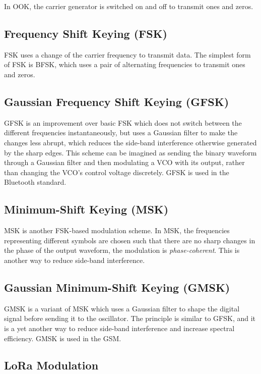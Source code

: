 In \gls{OOK}, the carrier generator is switched on and off to transmit ones and zeros. 

\subsection{Frequency Shift Keying (FSK)}

\Gls{FSK} uses a change of the carrier frequency to transmit data. The simplest form of \gls{FSK} is \gls{BFSK}, which uses a pair of alternating frequencies to transmit ones and zeros.

\subsection{Gaussian Frequency Shift Keying (GFSK)}

\Gls{GFSK} is an improvement over basic \gls{FSK} which does not switch between the different frequencies instantaneously, but uses a Gaussian filter to make the changes less abrupt, which reduces the side-band interference otherwise generated by the sharp edges. This scheme can be imagined as sending the binary waveform through a Gaussian filter and then modulating a \gls{VCO} with its output, rather than changing the \gls{VCO}'s control voltage discretely. \Gls{GFSK} is used in the Bluetooth standard.

\subsection{Minimum-Shift Keying (MSK)}

\Gls{MSK} is another \gls{FSK}-based modulation scheme. In \gls{MSK}, the frequencies representing different symbols are chosen such that there are no sharp changes in the phase of the output waveform, the modulation is \textit{phase-coherent}. This is another way to reduce side-band interference.

\subsection{Gaussian Minimum-Shift Keying (GMSK)}

\Gls{GMSK} is a variant of \gls{MSK} which uses a Gaussian filter to shape the digital signal before sending it to the oscillator. The principle is similar to \gls{GFSK}, and it is a yet another way to reduce side-band interference and increase spectral efficiency. \gls{GMSK} is used in the \gls{GSM}.

\subsection{LoRa Modulation}

